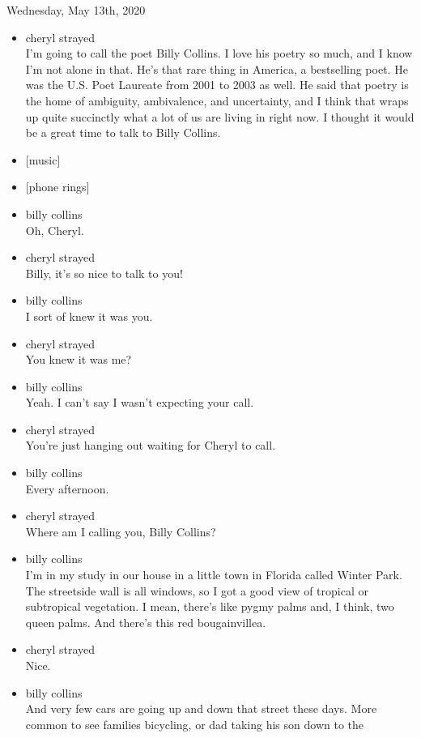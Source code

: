 Wednesday, May 13th, 2020

\begin{itemize}
\item
  cheryl strayed\\
  I'm going to call the poet Billy Collins. I love his poetry so much,
  and I know I'm not alone in that. He's that rare thing in America, a
  bestselling poet. He was the U.S. Poet Laureate from 2001 to 2003 as
  well. He said that poetry is the home of ambiguity, ambivalence, and
  uncertainty, and I think that wraps up quite succinctly what a lot of
  us are living in right now. I thought it would be a great time to talk
  to Billy Collins.
\item
  {[}music{]}
\item
  {[}phone rings{]}
\item
  billy collins\\
  Oh, Cheryl.
\item
  cheryl strayed\\
  Billy, it's so nice to talk to you!
\item
  billy collins\\
  I sort of knew it was you.
\item
  cheryl strayed\\
  You knew it was me?
\item
  billy collins\\
  Yeah. I can't say I wasn't expecting your call.
\item
  cheryl strayed\\
  You're just hanging out waiting for Cheryl to call.
\item
  billy collins\\
  Every afternoon.
\item
  cheryl strayed\\
  Where am I calling you, Billy Collins?
\item
  billy collins\\
  I'm in my study in our house in a little town in Florida called Winter
  Park. The streetside wall is all windows, so I got a good view of
  tropical or subtropical vegetation. I mean, there's like pygmy palms
  and, I think, two queen palms. And there's this red bougainvillea.
\item
  cheryl strayed\\
  Nice.
\item
  billy collins\\
  And very few cars are going up and down that street these days. More
  common to see families bicycling, or dad taking his son down to the

\end{itemize}
